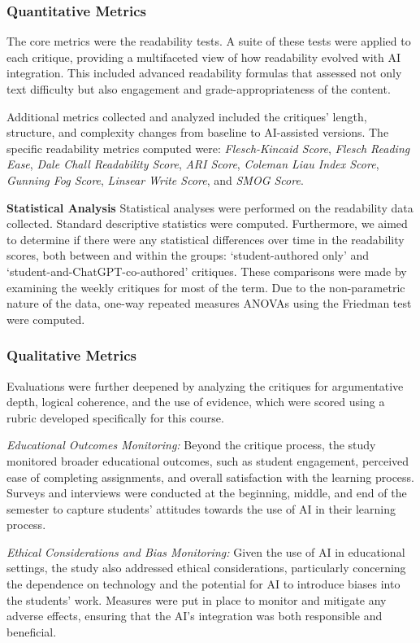 \subsubsection{Quantitative Metrics} 
The core metrics were the readability tests. A suite of these tests were applied to each critique, providing a multifaceted view of how readability evolved with AI integration. This included advanced readability formulas that assessed not only text difficulty but also engagement and grade-appropriateness of the content.

Additional metrics collected and analyzed included the critiques' length, structure, and complexity changes from baseline to AI-assisted versions.  The specific readability metrics computed were: \textit{Flesch-Kincaid Score}, \textit{Flesch Reading Ease}, \textit{Dale Chall Readability Score}, \textit{ARI Score}, \textit{Coleman Liau Index Score}, \textit{Gunning Fog Score}, \textit{Linsear Write Score}, and \textit{SMOG Score}.

\textbf{Statistical Analysis}
Statistical analyses were performed on the readability data collected. Standard descriptive statistics were computed. Furthermore, we aimed to determine if there were any statistical differences over time in the readability scores, both between and within the groups: `student-authored only' and `student-and-ChatGPT-co-authored' critiques. These comparisons were made by examining the weekly critiques for most of the term. Due to the non-parametric nature of the data, one-way repeated measures ANOVAs using the Friedman test were computed.

\subsubsection{Qualitative Metrics}
Evaluations were further deepened by analyzing the critiques for argumentative depth, logical coherence, and the use of evidence, which were scored using a rubric developed specifically for this course.

\textit{Educational Outcomes Monitoring:}
Beyond the critique process, the study monitored broader educational outcomes, such as student engagement, perceived ease of completing assignments, and overall satisfaction with the learning process. Surveys and interviews were conducted at the beginning, middle, and end of the semester to capture students’ attitudes towards the use of AI in their learning process.

\textit{Ethical Considerations and Bias Monitoring:}
Given the use of AI in educational settings, the study also addressed ethical considerations, particularly concerning the dependence on technology and the potential for AI to introduce biases into the students' work. Measures were put in place to monitor and mitigate any adverse effects, ensuring that the AI's integration was both responsible and beneficial.